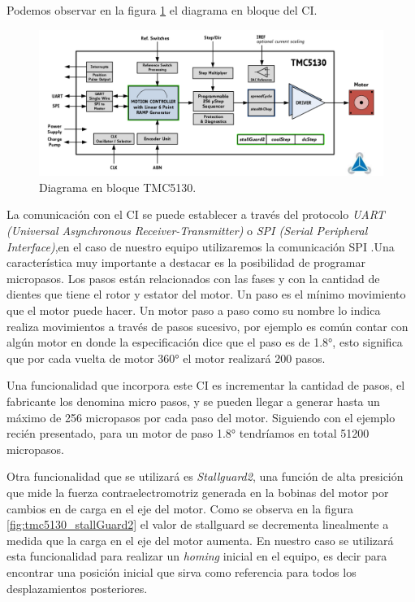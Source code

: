 Podemos observar en la figura \ref{fig:tmc5130_diagrama} el diagrama en bloque del CI. 

\begin{figure}[ht]
\centering 
\includegraphics[width=1.1\textwidth]{./Figures/tmc5130_diagrama.png}
\caption{Diagrama en bloque TMC5130.}
\label{fig:tmc5130_diagrama}
\end{figure}

La comunicación con el CI se puede establecer a través del protocolo \textit{ UART (Universal Asynchronous Receiver-Transmitter)} o \textit{SPI (Serial Peripheral Interface)},en el caso de nuestro equipo utilizaremos la comunicación SPI  .Una característica muy importante a destacar es la posibilidad de programar micropasos. Los pasos están relacionados con las fases  y con la cantidad de dientes que tiene el rotor y estator del motor. Un paso es el mínimo movimiento que el motor puede hacer. Un motor paso a paso como su nombre lo indica realiza movimientos a través de pasos sucesivo, por ejemplo es común contar con algún motor en donde la especificación dice que el paso es de \ang{1.8}, esto significa que por cada vuelta de motor \ang{360} el motor realizará 200 pasos.

Una funcionalidad que incorpora este CI es incrementar la cantidad de pasos, el fabricante los denomina micro pasos, y se pueden llegar a generar hasta un máximo de 256 micropasos por cada paso del motor. Siguiendo con el ejemplo recién presentado, para un motor de paso \ang{1.8} tendríamos en total 51200 micropasos.


Otra funcionalidad que se utilizará es \textit{Stallguard2}, una función de alta presición que mide la fuerza contraelectromotriz generada en la bobinas del motor por cambios en de carga en el eje del motor. Como se observa en la figura \ref{fig:tmc5130_stallGuard2} el valor de stallguard se decrementa linealmente a medida que la carga en el eje del motor aumenta. En nuestro caso se utilizará esta funcionalidad para realizar un \textit{homing} inicial en el equipo, es decir para encontrar una posición inicial que sirva como referencia para todos los desplazamientos posteriores.
     

